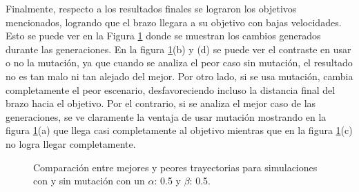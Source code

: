 \documentclass[12pt]{article}
\begin{document}
Finalmente, respecto a los resultados finales se lograron los objetivos mencionados, logrando que el brazo llegara a su objetivo con bajas velocidades. Esto se puede ver en la Figura \ref{lalalalalal} donde se muestran los cambios generados durante las generaciones. En la figura \ref{lalalalalal}(b) y (d) se puede ver el contraste en usar o no la mutación, ya que cuando se analiza el peor caso sin mutación, el resultado no es tan malo ni tan alejado del mejor. Por otro lado, si se usa mutación, cambia completamente el peor escenario, desfavoreciendo incluso la distancia final del brazo hacia el objetivo. Por el contrario, si se analiza el mejor caso de las generaciones, se ve claramente la ventaja de usar mutación mostrando en la figura \ref{lalalalalal}(a) que llega casi completamente al objetivo mientras que en la figura \ref{lalalalalal}(c) no logra llegar completamente.


\begin{figure}
\centering
{}
\caption{Comparación entre mejores y peores trayectorias para simulaciones con y sin mutación con un $\alpha$: 0.5 y $\beta$: 0.5.}
\label{lalalalalal}
\end{figure}
\end{document}
